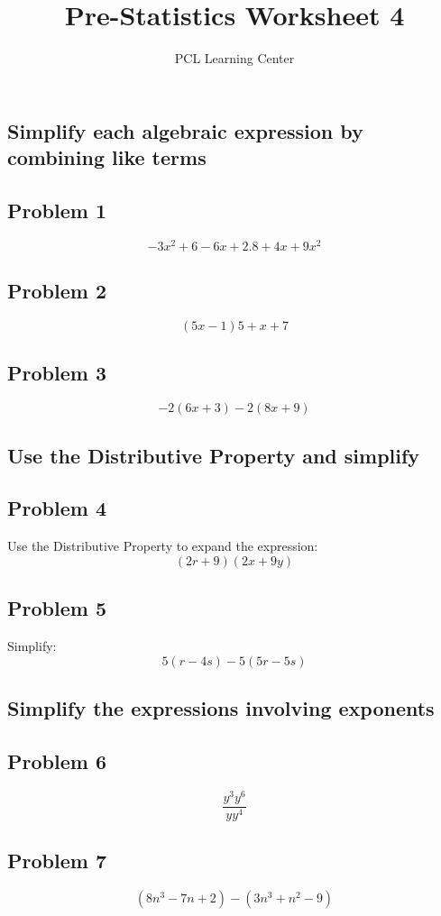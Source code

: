 \documentclass[12pt]{article}
\title{Pre-Statistics Worksheet 4}
\author{PCL Learning Center}
\date{}
\begin{document}
\maketitle

\subsection*{Simplify each algebraic expression by combining like terms}

\subsection*{Problem 1}
\[
-3x^2 + 6 - 6x + 2.8 + 4x + 9x^2
\]

\subsection*{Problem 2}
\[
(5x - 1)5 + x + 7
\]

\subsection*{Problem 3}
\[
-2(6x + 3) - 2(8x + 9)
\]

\subsection*{Use the Distributive Property and simplify}

\subsection*{Problem 4}
Use the Distributive Property to expand the expression:  
\[
(2r + 9)(2x + 9y)
\]

\subsection*{Problem 5}
Simplify:  
\[
5(r - 4s) - 5(5r - 5s)
\]

\subsection*{Simplify the expressions involving exponents}

\subsection*{Problem 6}
\[
\frac{y^3 y^6}{y y^4}
\]

\subsection*{Problem 7}
\[
(8n^3 - 7n + 2) - (3n^3 + n^2 - 9)
\]
\end{document}
